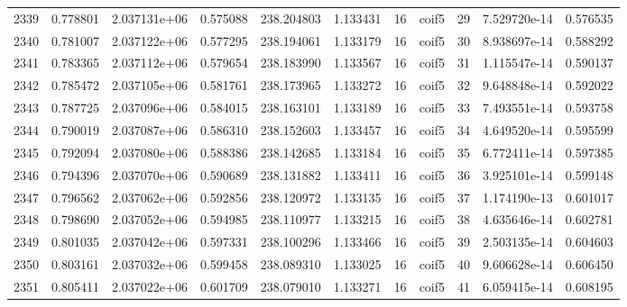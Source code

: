 \begin{tabular}{lrrrrrrlrrr}
2339 &    0.778801 &        2.037131e+06 &  0.575088 &              238.204803 &    1.133431 &      16 &        coif5 &     29 &   7.529720e-14 &      0.576535 \\
2340 &    0.781007 &        2.037122e+06 &  0.577295 &              238.194061 &    1.133179 &      16 &        coif5 &     30 &   8.938697e-14 &      0.588292 \\
2341 &    0.783365 &        2.037112e+06 &  0.579654 &              238.183990 &    1.133567 &      16 &        coif5 &     31 &   1.115547e-14 &      0.590137 \\
2342 &    0.785472 &        2.037105e+06 &  0.581761 &              238.173965 &    1.133272 &      16 &        coif5 &     32 &   9.648848e-14 &      0.592022 \\
2343 &    0.787725 &        2.037096e+06 &  0.584015 &              238.163101 &    1.133189 &      16 &        coif5 &     33 &   7.493551e-14 &      0.593758 \\
2344 &    0.790019 &        2.037087e+06 &  0.586310 &              238.152603 &    1.133457 &      16 &        coif5 &     34 &   4.649520e-14 &      0.595599 \\
2345 &    0.792094 &        2.037080e+06 &  0.588386 &              238.142685 &    1.133184 &      16 &        coif5 &     35 &   6.772411e-14 &      0.597385 \\
2346 &    0.794396 &        2.037070e+06 &  0.590689 &              238.131882 &    1.133411 &      16 &        coif5 &     36 &   3.925101e-14 &      0.599148 \\
2347 &    0.796562 &        2.037062e+06 &  0.592856 &              238.120972 &    1.133135 &      16 &        coif5 &     37 &   1.174190e-13 &      0.601017 \\
2348 &    0.798690 &        2.037052e+06 &  0.594985 &              238.110977 &    1.133215 &      16 &        coif5 &     38 &   4.635646e-14 &      0.602781 \\
2349 &    0.801035 &        2.037042e+06 &  0.597331 &              238.100296 &    1.133466 &      16 &        coif5 &     39 &   2.503135e-14 &      0.604603 \\
2350 &    0.803161 &        2.037032e+06 &  0.599458 &              238.089310 &    1.133025 &      16 &        coif5 &     40 &   9.606628e-14 &      0.606450 \\
2351 &    0.805411 &        2.037022e+06 &  0.601709 &              238.079010 &    1.133271 &      16 &        coif5 &     41 &   6.059415e-14 &      0.608195 \\

\end{tabular}
